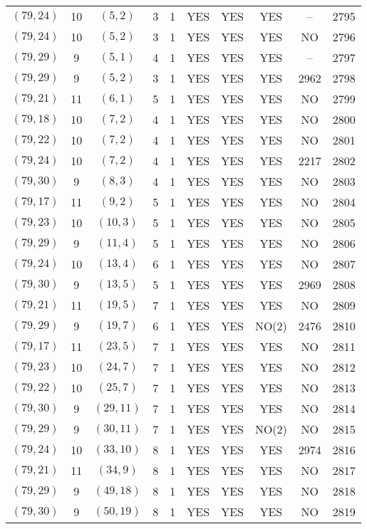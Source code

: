 \begin{longtable}{|c|c|c|c|c|c|c|c|c|c|}
$(79, 24)$ & 10 & $(5, 2)$ & 3 & 1 & YES & YES & YES & -- & 2795\\
$(79, 24)$ & 10 & $(5, 2)$ & 3 & 1 & YES & YES & YES & NO & 2796\\
$(79, 29)$ & 9 & $(5, 1)$ & 4 & 1 & YES & YES & YES & -- & 2797\\
$(79, 29)$ & 9 & $(5, 2)$ & 3 & 1 & YES & YES & YES & 2962 & 2798\\
$(79, 21)$ & 11 & $(6, 1)$ & 5 & 1 & YES & YES & YES & NO & 2799\\
$(79, 18)$ & 10 & $(7, 2)$ & 4 & 1 & YES & YES & YES & NO & 2800\\
$(79, 22)$ & 10 & $(7, 2)$ & 4 & 1 & YES & YES & YES & NO & 2801\\
$(79, 24)$ & 10 & $(7, 2)$ & 4 & 1 & YES & YES & YES & 2217 & 2802\\
$(79, 30)$ & 9 & $(8, 3)$ & 4 & 1 & YES & YES & YES & NO & 2803\\
$(79, 17)$ & 11 & $(9, 2)$ & 5 & 1 & YES & YES & YES & NO & 2804\\
$(79, 23)$ & 10 & $(10, 3)$ & 5 & 1 & YES & YES & YES & NO & 2805\\
$(79, 29)$ & 9 & $(11, 4)$ & 5 & 1 & YES & YES & YES & NO & 2806\\
$(79, 24)$ & 10 & $(13, 4)$ & 6 & 1 & YES & YES & YES & NO & 2807\\
$(79, 30)$ & 9 & $(13, 5)$ & 5 & 1 & YES & YES & YES & 2969 & 2808\\
$(79, 21)$ & 11 & $(19, 5)$ & 7 & 1 & YES & YES & YES & NO & 2809\\
$(79, 29)$ & 9 & $(19, 7)$ & 6 & 1 & YES & YES & NO(2) & 2476 & 2810\\
$(79, 17)$ & 11 & $(23, 5)$ & 7 & 1 & YES & YES & YES & NO & 2811\\
$(79, 23)$ & 10 & $(24, 7)$ & 7 & 1 & YES & YES & YES & NO & 2812\\
$(79, 22)$ & 10 & $(25, 7)$ & 7 & 1 & YES & YES & YES & NO & 2813\\
$(79, 30)$ & 9 & $(29, 11)$ & 7 & 1 & YES & YES & YES & NO & 2814\\
$(79, 29)$ & 9 & $(30, 11)$ & 7 & 1 & YES & YES & NO(2) & NO & 2815\\
$(79, 24)$ & 10 & $(33, 10)$ & 8 & 1 & YES & YES & YES & 2974 & 2816\\
$(79, 21)$ & 11 & $(34, 9)$ & 8 & 1 & YES & YES & YES & NO & 2817\\
$(79, 29)$ & 9 & $(49, 18)$ & 8 & 1 & YES & YES & YES & NO & 2818\\
$(79, 30)$ & 9 & $(50, 19)$ & 8 & 1 & YES & YES & YES & NO & 2819\\

\end{longtable}
